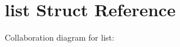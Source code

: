 \hypertarget{structlist}{}\section{list Struct Reference}
\label{structlist}


Collaboration diagram for list\+:
